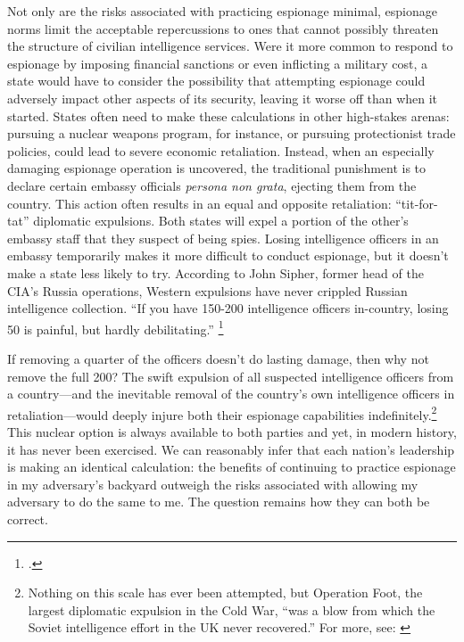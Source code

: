 \documentclass[14pt]{extarticle}
\begin{document}

Not only are the risks associated with practicing espionage minimal, espionage norms limit the acceptable repercussions to ones that cannot possibly threaten the structure of civilian intelligence services. Were it more common to respond to espionage by imposing financial sanctions or even inflicting a military cost, a state would have to consider the possibility that attempting espionage could adversely impact other aspects of its security, leaving it worse off than when it started. States often need to make these calculations in other high-stakes arenas: pursuing a nuclear weapons program, for instance, or pursuing protectionist trade policies, could lead to severe economic retaliation. Instead, when an especially damaging espionage operation is uncovered, the traditional punishment is to declare certain embassy officials \emph{persona non grata}, ejecting them from the country. This action often results in an equal and opposite retaliation: \enquote{tit-for-tat} diplomatic expulsions. Both states will expel a portion of the other's embassy staff that they suspect of being spies. Losing intelligence officers in an embassy temporarily makes it more difficult to conduct espionage, but it doesn't make a state less likely to try. According to John Sipher, former head of the CIA's Russia operations, Western expulsions have never crippled Russian intelligence collection. \enquote{If you have 150-200 intelligence officers in-country, losing 50 is painful, but hardly debilitating.} \footcite{dettmer_united_2018}

If removing a quarter of the officers doesn't do lasting damage, then why not remove the full 200? The swift expulsion of all suspected intelligence officers from a country---and the inevitable removal of the country's own intelligence officers in retaliation---would deeply injure both their espionage capabilities indefinitely.\footnote{Nothing on this scale has ever been attempted, but Operation Foot, the largest diplomatic expulsion in the Cold War, \enquote{was a blow from which the Soviet intelligence effort in the UK never recovered.} For more, see: \cite{hughes_giving_2006-1}} This nuclear option is always available to both parties and yet, in modern history, it has never been exercised. We can reasonably infer that each nation's leadership is making an identical calculation: the benefits of continuing to practice espionage in my adversary's backyard outweigh the risks associated with allowing my adversary to do the same to me. The question remains how they can both be correct.
\end{document}
